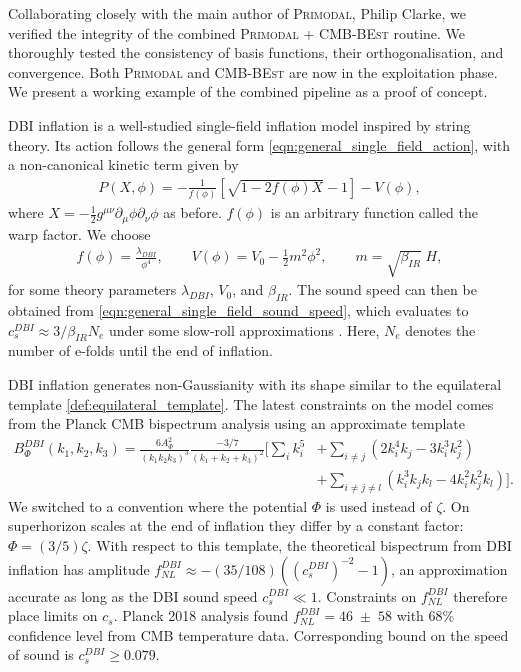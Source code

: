 Collaborating closely with the main author of \textsc{Primodal}, Philip Clarke, we verified the integrity of the combined \textsc{Primodal} + \textsc{CMB-BEst} routine. We thoroughly tested the consistency of basis functions, their orthogonalisation, and convergence. Both \textsc{Primodal} and \textsc{CMB-BEst} are now in the exploitation phase. We present a working example of the combined pipeline as a proof of concept.

DBI inflation \cite{Silverstein2004dbi,Alishahiha2004dbi,Chen2005runningdbi,Bean2008comparingdbi} is a well-studied single-field inflation model inspired by string theory. Its action follows the general form \eqref{eqn:general_single_field_action}, with a non-canonical kinetic term given by
\begin{align}
	P(X,\phi) = - \frac{1}{f(\phi)} \left[ \sqrt{1 - 2f(\phi)X} - 1 \right] - V(\phi),
\end{align}
where $X=-\frac{1}{2} g^{\mu\nu} \partial_\mu \phi \partial_\nu \phi$ as before. $f(\phi)$ is an arbitrary function called the warp factor. We choose
\begin{align}
	f(\phi) = \frac{\lambda_{DBI}}{\phi^4}, \qquad V(\phi) = V_0 - \frac{1}{2}m^2\phi^2, \qquad m = \sqrt{\beta_{IR}} \; H,
\end{align}
for some theory parameters $\lambda_{DBI}$, $V_0$, and $\beta_{IR}$. The sound speed can then be obtained from \eqref{eqn:general_single_field_sound_speed}, which evaluates to $c^{DBI}_s \approx 3/\beta_{IR} N_e$ under some slow-roll approximations \cite{Chen2005runningdbi}. Here, $N_e$ denotes the number of e-folds until the end of inflation.

DBI inflation generates non-Gaussianity with its shape similar to the equilateral template \eqref{def:equilateral_template}. The latest constraints on the model comes from the Planck CMB bispectrum analysis using an approximate template 
\begin{align}
	B_\Phi^{DBI}(k_1,k_2,k_3) = \frac{6A_\Phi^2}{(k_1 k_2 k_3)^3} \frac{-3/7}{(k_1 + k_2 + k_3)^2} \bigg[ \sum_i k_i^5 &+ \sum_{i\neq j} (2k_i^4 k_j - 3k_i^3 k_j^2)  \nonumber \\
	&+ \sum_{i\neq j\neq l} (k_i^3 k_j k_l - 4k_i^2 k_j^2 k_l) \bigg]. \label{eqn:dbi_bispectrum_template}
\end{align}
We switched to a convention where the potential $\Phi$ is used instead of $\zeta$. On superhorizon scales at the end of inflation they differ by a constant factor: $\Phi = (3/5)\zeta$. With respect to this template, the theoretical bispectrum from DBI inflation has amplitude $f_{NL}^{DBI} \approx - (35/108)((c^{DBI}_s)^{-2}-1)$, an approximation accurate as long as the DBI sound speed $c^{DBI}_s \ll 1$. Constraints on $f_{NL}^{DBI}$ therefore place limits on $c_s$. Planck 2018 analysis \cite{PlanckCollaboration2018} found $f_{NL}^{DBI} = 46 \;\pm\; 58$ with 68\% confidence level from CMB temperature data. Corresponding bound on the speed of sound is $c^{DBI}_s \ge 0.079$.

